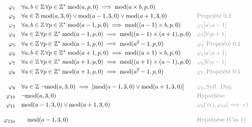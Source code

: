\documentclass{article}
\newcommand{\subst}[2]{#1 \backslash #2}
\begin{document}
\begin{align*}
\varphi_1 \quad & \forall a, b \in \mathbb{Z} \, \forall p \in \mathbb{Z}^* \; \text{mod}(a, p, 0) \implies \text{mod}(a \times b, p, 0) && \\
\varphi_2 \quad & \forall a \in \mathbb{Z} \; \text{mod}(a, 3, 0) \lor \text{mod}(a-1, 3, 0) \lor \text{mod}(a+1, 3, 0) && \textcolor{Gray}{\text{Propriété 0.2}} \\
\varphi_3 \quad & \forall a, b \in \mathbb{Z} \, \forall p \in \mathbb{Z}^* \; \text{mod}(a - 1, p, 0) \implies \text{mod}((a - 1) \times b, p, 0) && \textcolor{Gray}{\varphi_1[\subst{a}{a - 1}]} \\
\varphi_4 \quad & \forall a \in \mathbb{Z} \, \forall p \in \mathbb{Z}^* \; \text{mod}(a - 1, p, 0) \implies \text{mod}((a - 1) \times (a + 1), p, 0) && \textcolor{Gray}{\varphi_3[\subst{b}{a + 1}]} \\
\varphi_5 \quad & \forall a \in \mathbb{Z} \, \forall p \in \mathbb{Z}^* \; \text{mod}(a - 1, p, 0) \implies \text{mod}(a^2 - 1, p, 0) && \textcolor{Gray}{\varphi_4, \text{Propriété 0.1}} \\
\varphi_6 \quad & \forall a, b \in \mathbb{Z} \, \forall p \in \mathbb{Z}^* \; \text{mod}(a + 1, p, 0) \implies \text{mod}((a + 1) \times b, p, 0) && \textcolor{Gray}{\varphi_1[\subst{a}{a + 1}]} \\
\varphi_7 \quad & \forall a \in \mathbb{Z} \, \forall p \in \mathbb{Z}^* \; \text{mod}(a + 1, p, 0) \implies \text{mod}((a + 1) \times (a - 1), p, 0) && \textcolor{Gray}{\varphi_6[\subst{b}{a - 1}]} \\
\varphi_8 \quad & \forall a \in \mathbb{Z} \, \forall p \in \mathbb{Z}^* \; \text{mod}(a + 1, p, 0) \implies \text{mod}(a^2 - 1, p, 0) && \textcolor{Gray}{\varphi_7, \text{Propriété 0.1}} \\[1em] %
\varphi_9 \quad & \forall a \in \mathbb{Z} \; \neg\text{mod}(a, 3, 0) \implies [\text{mod}(a - 1, 3, 0) \lor \text{mod}(a + 1, 3, 0)] && \textcolor{Gray}{\varphi_2, \text{Syll. Disj.}} \\
\varphi_{10} \quad & \neg\text{mod}(a, 3, 0) && \textcolor{Gray}{\text{Hypothèse }} \\
\varphi_{11} \quad & \text{mod}(a - 1, 3, 0) \lor \text{mod}(a + 1, 3, 0) && \textcolor{Gray}{\varphi_9(\forall e), \varphi_{10} (\implies e)} \\[1em] %
\varphi_{12a} \quad & \quad \text{mod}(a - 1, 3, 0) && \textcolor{Gray}{\text{Hypothèse (Cas 1)}} \\

\end{align*}
\end{document}
